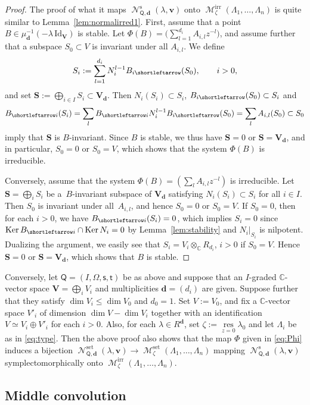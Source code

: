 \documentclass[pdftex]{sigma}
\newcommand{\slar}{\shortleftarrow}
\numberwithin{equation}{section}
\theoremstyle{definition}
\newcommand{\lemref}[1]{Lemma~\ref{#1}}
\newcommand{\C}{\mathbb{C}} %
\newcommand{\Ker}{\operatorname{Ker}}
\newcommand{\unit}{\mathrm{Id}}
\newcommand{\bV}{\mathbf{V}}
\newcommand{\bv}{\mathbf{v}}
\newcommand{\bS}{\mathbf{S}}
\newcommand{\res}{\operatorname*{res}}
\newcommand{\ved}{\mathbf{d}}
\newcommand{\Mirr}{\operatorname{\mathcal{M}}^\mathrm{irr}}
\newcommand{\Mset}{\operatorname{\mathcal{M}}^\mathrm{set}}
\newcommand{\Qst}{\operatorname{\mathscr{N}}^\mathrm{s}}
\newcommand{\Qset}{\operatorname{\mathscr{N}}^\mathrm{set}}
\newcommand{\vin}{\mathsf{t}} %
\newcommand{\vout}{\mathsf{s}} %
\newcommand{\QQ}{\mathsf{Q}} %
\begin{document}
\begin{proof}
The proof of what it maps $\Qst_{\QQ,\ved}(\lambda,\bv)$ onto
$\Mirr_\zeta(\Lambda_1,\dots ,\Lambda_n)$
is quite similar to \lemref{lem:normalirred1}.
First, assume that a point
$B \in \mu_\ved^{-1}(-\lambda\,\unit_{\bV})$ is stable.
Let $\Phi(B) = \Big (\sum\limits_{l=1}^{d_i} A_{i,l}z^{-l}\Big)$,
and assume further that a subspace $S_0 \subset V$ is invariant
under all $A_{i,l}$.
We def\/ine
\[
S_i := \sum_{l=1}^{d_i} N_i^{l-1} B_{i \slar}(S_0), \qquad i>0,
\]
and set $\bS := \bigoplus_{i \in I} S_i \subset \bV_\ved$.
Then $N_i(S_i) \subset S_i$, $B_{i \slar}(S_0) \subset S_i$ and
\[
B_{\slar i}(S_i) = \sum_l B_{\slar i}N_i^{l-1}B_{i \slar}(S_0)
= \sum_l A_{i,l}(S_0) \subset S_0
\]
imply that $\bS$ is $B$-invariant.
Since $B$ is stable,
we thus have $\bS=0$ or $\bS=\bV_\ved$,
and in particular, $S_0=0$ or $S_0=V$,
which shows that the system $\Phi(B)$ is irreducible.

Conversely, assume that the system
$\Phi(B)=(\sum_l A_{i,l}z^{-l})$ is irreducible.
Let $\bS=\bigoplus_i S_i$ be a~$B$-invariant subspace of $\bV_\ved$
satisfying $N_i(S_i) \subset S_i$ for all $i \in I$.
Then $S_0$ is invariant under all~$A_{i,l}$,
and hence $S_0=0$ or $S_0=V$.
If $S_0=0$, then for each $i>0$, we have $B_{\slar i}(S_i)=0$,
which implies $S_i=0$
since $\Ker B_{\slar i} \cap \Ker N_i =0$ by \lemref{lem:stability}
and $N_i |_{S_i}$ is nilpotent.
Dualizing the argument, we easily see that
$S_i = V_i \otimes_\C R_{d_i}$, $i>0$ if $S_0=V$.
Hence $\bS=0$ or $\bS=\bV_\ved$, which shows that
$B$ is stable.
\end{proof}

Conversely, let $\QQ=(I,\Omega,\vout,\vin)$ be as above
and suppose that an $I$-graded $\C$-vector space $\bV=\bigoplus_i V_i$
and multiplicities $\ved=(d_i)$ are given.
Suppose further that they satisfy
$\dim V_i \leq \dim V_0$ and $d_0=1$.
Set $V:=V_0$, and f\/ix a $\C$-vector space $V'_i$ of dimension
$\dim V - \dim V_i$ together with an identif\/ication
$V \simeq V_i \oplus V'_i$ for each $i>0$.
Also, for each $\lambda \in R^\ved$,
set $\zeta := \res\limits_{z=0} \lambda_0$ and let
$\Lambda_i$ be as in \eqref{eq:type}.
Then the above proof also shows that
the map $\Phi$ given in \eqref{eq:Phi} induces a bijection
$\Qset_{\QQ,\ved}(\lambda,\bv) \to \Mset_\zeta(\Lambda_1,\dots ,\Lambda_n)$
mapping $\Qst_{\QQ,\ved}(\lambda,\bv)$ symplectomorphically onto
$\Mirr_\zeta(\Lambda_1,\dots ,\Lambda_n)$.

\subsection{Middle convolution}\label{subsec:middle}
\end{document}
